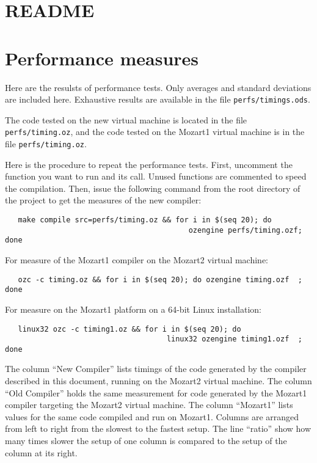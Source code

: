 \documentclass[a4paper]{memoir}
\begin{document}
\begin{appendices}


\chapter{README}\label{appendix:readme}

\chapter{Performance measures}\label{appendix:performance}
Here are the resulsts of performance tests. Only averages and standard deviations are included here.
Exhaustive results are available in the file \lstinline!perfs/timings.ods!.

The code tested on the new virtual machine is located in the file \lstinline!perfs/timing.oz!, and the
code tested on the Mozart1 virtual machine is in the file \lstinline!perfs/timing.oz!.

Here is the procedure to repeat the performance tests. First, uncomment the function you want to run and its call.
Unused functions are commented to speed the compilation. Then, issue the following command from the root directory of the project
to get the measures of the new compiler:
\begin{lstlisting}
   make compile src=perfs/timing.oz && for i in $(seq 20); do  
                                          ozengine perfs/timing.ozf; done
\end{lstlisting}
For measure of the Mozart1 compiler on the Mozart2 virtual machine:
\begin{lstlisting}
   ozc -c timing.oz && for i in $(seq 20); do ozengine timing.ozf  ; done 
\end{lstlisting}
For measure on the Mozart1 platform on a 64-bit Linux installation:
\begin{lstlisting}
   linux32 ozc -c timing1.oz && for i in $(seq 20); do 
                                     linux32 ozengine timing1.ozf  ; done
\end{lstlisting}
The column ``New Compiler'' lists timings of the code generated by the compiler
described in this document, running on the Mozart2 virtual machine. The column ``Old
Compiler'' holds the same measurement for code generated by the Mozart1 compiler
targeting the Mozart2 virtual machine. The column ``Mozart1'' lists values for
the same code compiled and run on Mozart1.
Columns are arranged from left to right from the slowest to the fastest setup.
The line ``ratio'' show how many times slower the setup of one column is
compared to the setup of the column at its right.


\end{appendices}
\end{document}
